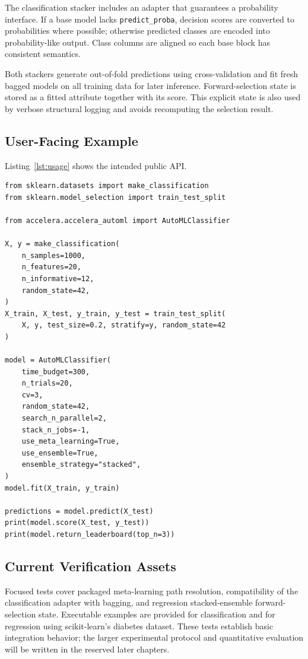 \documentclass[12pt,a4paper,oneside]{report}
\begin{document}
The classification stacker includes an adapter that guarantees a probability
interface. If a base model lacks \texttt{predict\_proba}, decision scores are
converted to probabilities where possible; otherwise predicted classes are
encoded into probability-like output. Class columns are aligned so each base
block has consistent semantics.

\medskip

\noindent Both stackers generate out-of-fold predictions using cross-validation and fit
fresh bagged models on all training data for later inference. Forward-selection
state is stored as a fitted attribute together with its score. This explicit
state is also used by verbose structural logging and avoids recomputing the
selection result.

\subsection{User-Facing Example}

Listing~\ref{lst:usage} shows the intended public API.

\begin{lstlisting}[style=pythonstyle,caption={Classification with Accelera AutoML},label={lst:usage}]
from sklearn.datasets import make_classification
from sklearn.model_selection import train_test_split

from accelera.accelera_automl import AutoMLClassifier

X, y = make_classification(
    n_samples=1000,
    n_features=20,
    n_informative=12,
    random_state=42,
)
X_train, X_test, y_train, y_test = train_test_split(
    X, y, test_size=0.2, stratify=y, random_state=42
)

model = AutoMLClassifier(
    time_budget=300,
    n_trials=20,
    cv=3,
    random_state=42,
    search_n_parallel=2,
    stack_n_jobs=-1,
    use_meta_learning=True,
    use_ensemble=True,
    ensemble_strategy="stacked",
)
model.fit(X_train, y_train)

predictions = model.predict(X_test)
print(model.score(X_test, y_test))
print(model.return_leaderboard(top_n=3))
\end{lstlisting}

\subsection{Current Verification Assets}

Focused tests cover packaged meta-learning path resolution, compatibility of
the classification adapter with bagging, and regression stacked-ensemble
forward-selection state. Executable examples are provided for classification
and for regression using scikit-learn's diabetes dataset. These tests establish
basic integration behavior; the larger experimental protocol and quantitative
evaluation will be written in the reserved later chapters.
\end{document}
